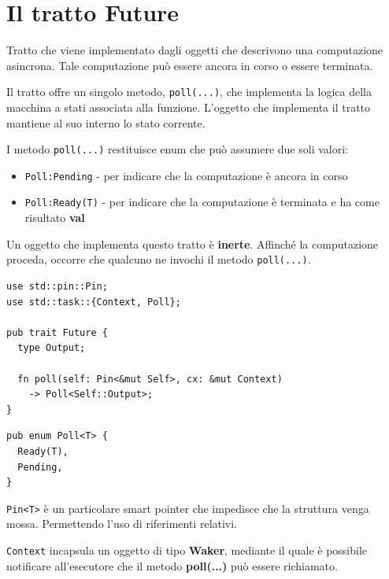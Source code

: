 \section{Il tratto Future}

Tratto che viene implementato dagli oggetti che descrivono una computazione
asincrona. Tale computazione può essere ancora in corso o essere terminata.

Il tratto offre un singolo metodo, \verb|poll(...)|, che implementa la logica della
macchina a stati associata alla funzione.
L'oggetto che implementa il tratto mantiene al suo interno lo stato corrente.

I metodo \verb|poll(...)| restituisce enum che può assumere due soli valori:
\begin{itemize}
  \item \verb|Poll:Pending| - per indicare che la computazione è ancora in corso
  \item \verb|Poll:Ready(T)| - per indicare che la computazione è terminata e ha come risultato \textbf{val}
\end{itemize}

Un oggetto che implementa questo tratto è \textbf{inerte}.
Affinché la computazione proceda, occorre che qualcuno ne invochi il metodo \verb|poll(...)|.



\begin{center}
  \begin{minipage}{0.65\linewidth}
    \begin{verbatim}
use std::pin::Pin;
use std::task::{Context, Poll};

pub trait Future {
  type Output;

  fn poll(self: Pin<&mut Self>, cx: &mut Context)
    -> Poll<Self::Output>;
}
    \end{verbatim}
  \end{minipage}%
  \hfill
  \begin{minipage}{0.3\linewidth}
    \begin{verbatim}
pub enum Poll<T> {
  Ready(T),
  Pending,
}
\end{verbatim}
  \end{minipage}
\end{center}

\verb|Pin<T>| è un particolare smart pointer che impedisce che la struttura venga mossa.
Permettendo l'uso di riferimenti relativi.


\verb|Context| incapsula un oggetto di tipo \textbf{Waker}, mediante il quale è possibile
notificare all'esecutore che il metodo \textbf{poll(...)} può essere richiamato.


